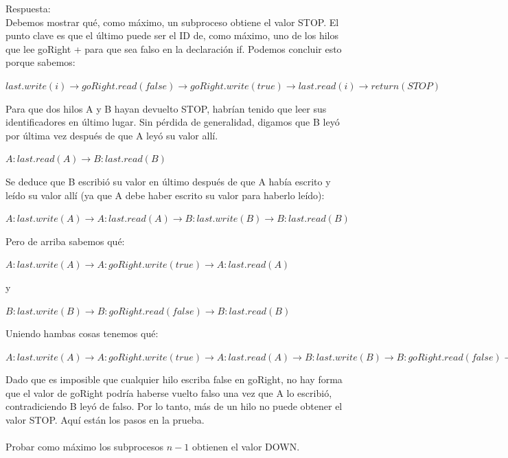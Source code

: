 \documentclass[12pt, letterpaper]{article}
\begin{document}
\begin{itemize}
Respuesta:\\
Debemos mostrar qu\'e, como m\'aximo, un subproceso obtiene el valor STOP.
El punto clave es que el último puede ser el ID de, como máximo, uno de los hilos que
lee goRight + para que sea falso en la declaraci\'on if.
Podemos concluir esto porque sabemos: 
\begin{center}
$last.write(i) \rightarrow goRight.read(false) \rightarrow goRight.write(true) \rightarrow last.read(i) \rightarrow return(STOP)$
\end{center}

Para que dos hilos A y B hayan devuelto STOP, habrían tenido que leer sus identificadores en \'ultimo lugar. Sin p\'erdida de generalidad, digamos que B ley\'o por \'ultima vez despu\'es de que A ley\'o su valor allí.

\begin{center}
$A:last.read(A) \rightarrow B:last.read(B)$
\end{center}

Se deduce que B escribi\'o su valor en \'ultimo después de que A hab\'ia escrito y le\'ido su valor
all\'i (ya que A debe haber escrito su valor para haberlo le\'ido):

\begin{center}

$A:last.write(A) \rightarrow A:last.read(A) \rightarrow B:last.write(B) \rightarrow B:last.read(B)$
\end{center}

Pero de arriba sabemos qu\'e:

\begin{center}
$A:last.write(A) \rightarrow A:goRight.write(true) \rightarrow A:last.read(A)$
\end{center}
y

\begin{center}
$B:last.write(B) \rightarrow B:goRight.read(false) \rightarrow B : last.read(B)$
\end{center}

Uniendo hambas cosas tenemos qu\'e:


\begin{center}
$A:last.write(A) \rightarrow A:goRight.write(true) \rightarrow A:last.read(A) \rightarrow B:last.write(B) \rightarrow B:goRight.read(false) \rightarrow B:last.read(B)$
\end{center}

Dado que es imposible que cualquier hilo escriba false en goRight, no hay forma que el valor de goRight podr\'ia haberse vuelto falso una vez que A lo escribi\'o, contradiciendo B ley\'o de falso.
Por lo tanto, m\'as de un hilo no puede obtener el valor STOP. Aqu\'i están los pasos en la prueba.
\\ \\
Probar como m\'aximo los subprocesos $n-1$ obtienen el valor DOWN.


\end{itemize}
\end{document}
